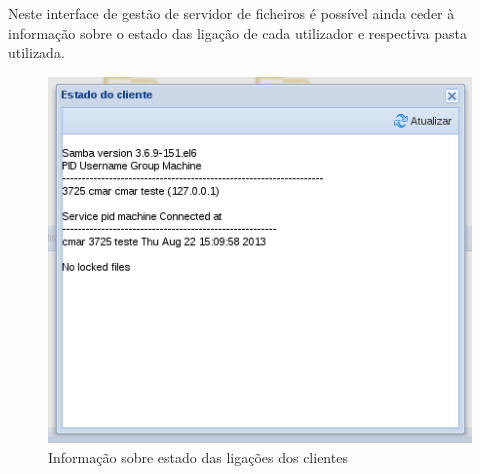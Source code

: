 Neste interface de gestão de servidor de ficheiros é possível ainda ceder à informação sobre o estado das ligação de cada utilizador e respectiva pasta utilizada.

\begin{figure}[H]
    \begin{center}
    \includegraphics[scale=0.38]{screenshots/etfs/etfs_client_status.png}
    \caption{Informação sobre estado das ligações dos clientes}
    \label{fig:etfs_client_status}
    \end{center}
\end{figure}

